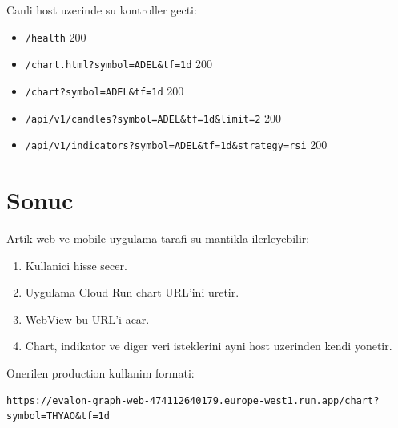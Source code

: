 \documentclass[11pt,a4paper]{article}
\begin{document}
Canli host uzerinde su kontroller gecti:

\begin{itemize}
  \item \texttt{/health} 200
  \item \texttt{/chart.html?symbol=ADEL\&tf=1d} 200
  \item \texttt{/chart?symbol=ADEL\&tf=1d} 200
  \item \texttt{/api/v1/candles?symbol=ADEL\&tf=1d\&limit=2} 200
  \item \texttt{/api/v1/indicators?symbol=ADEL\&tf=1d\&strategy=rsi} 200
\end{itemize}

\section{Sonuc}

Artik web ve mobile uygulama tarafi su mantikla ilerleyebilir:

\begin{enumerate}
  \item Kullanici hisse secer.
  \item Uygulama Cloud Run chart URL'ini uretir.
  \item WebView bu URL'i acar.
  \item Chart, indikator ve diger veri isteklerini ayni host uzerinden kendi yonetir.
\end{enumerate}

Onerilen production kullanim formati:

\begin{lstlisting}[style=evalon]
https://evalon-graph-web-474112640179.europe-west1.run.app/chart?symbol=THYAO&tf=1d
\end{lstlisting}
\end{document}
